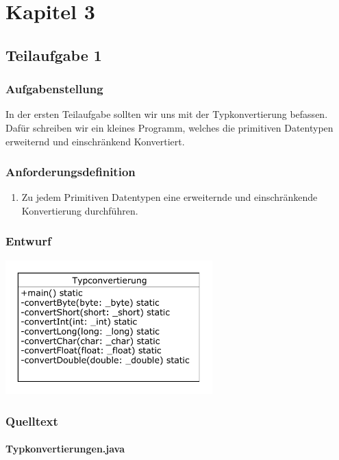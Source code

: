 \section{Kapitel 3}
\subsection{Teilaufgabe 1}
\subsubsection{Aufgabenstellung}
In der ersten Teilaufgabe sollten wir uns mit der Typkonvertierung befassen. Dafür schreiben wir
ein kleines Programm, welches die primitiven Datentypen erweiternd und einschränkend
Konvertiert.

\subsubsection{Anforderungsdefinition}
\begin{enumerate}
	\item Zu jedem Primitiven Datentypen eine erweiternde und einschränkende Konvertierung
	durchführen.
\end{enumerate}

\subsubsection{Entwurf}
\begin{center}
	\includegraphics[width=0.6\textwidth]{uml/uml_c3_p1.pdf}
\end{center}

\subsubsection{Quelltext}
\paragraph{Typkonvertierungen.java}\


